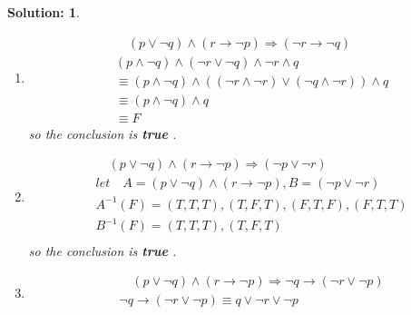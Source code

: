 \documentclass{article}
\theoremstyle{break}
\newtheorem*{solution*}{\textbf{Solution:} }
\begin{document}
\begin{enumerate}
\begin{solution*}
\begin{enumerate}
\begin{equation*}
\begin{aligned}
                    & B^{-1}(T) = (T,T,F),(F,T,F),(F,F,F),(T,F,F),(T,F,T),(F,F,T) \\              
                \end{aligned}
            \end{equation*}
            so the conclusion is \textbf{true} .
            \item 
            \begin{equation*}
                \begin{aligned}
                    & \quad (p \lor \lnot q) \land (r \to \lnot p) \Rightarrow (\lnot r \to \lnot q) \\    
                    & (p \land \lnot q) \land ( \lnot r \lor \lnot q) \land \lnot r \land q \\
                    & \equiv (p \land \lnot q) \land ((\lnot r \land \lnot r) \lor (\lnot q \land \lnot r)) \land q \\
                    & \equiv (p \land \lnot q ) \land q \\
                    & \equiv F
                \end{aligned}
            \end{equation*}
            so the conclusion is \textbf{true} .
            \item 
            \begin{equation*}
                \begin{aligned}
                    & \quad (p \lor \lnot q) \land (r \to \lnot p) \Rightarrow (\lnot p \lor\lnot r) \\ 
                    & let \quad A = ( p \lor \lnot q) \land (r \to \lnot p) ,  B = (\lnot p \lor\lnot r) \\
                    & A^{-1}(F) = (T,T,T),(T,F,T),(F,T,F),(F,T,T)\\
                    & B^{-1}(F) = (T,T,T),(T,F,T) \\    
                \end{aligned}
            \end{equation*}
            so the conclusion is \textbf{true} .
            \item 
            \begin{equation*}
                \begin{aligned}
                    & \quad (p \lor \lnot q) \land (r \to \lnot p) \Rightarrow \lnot q \to (\lnot r \lor \lnot p) \\ 
                    & \lnot q \to (\lnot r \lor \lnot p)  \equiv q \lor  \lnot r \lor \lnot p\\

\end{aligned}
\end{equation*}
\end{enumerate}
\end{solution*}
\end{enumerate}
\end{document}
